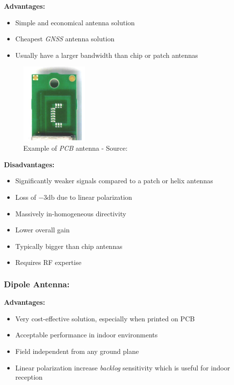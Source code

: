 \documentclass[report.tex]{subfiles}
\begin{document}
\begin{flushleft}
\textbf{Advantages:}
\end{flushleft}
\begin{itemize}
\item Simple and economical antenna solution
\item Cheapest \textit{GNSS} antenna solution
\item Usually have a larger bandwidth than chip or patch antennas
\end{itemize}

\begin{figure}[H]
	\centering
	\includegraphics[width=0.3\textwidth, angle=90]{Include/Figure/antenna/pcb_antenna.png}
	\caption{Example of \textit{PCB} antenna - Source:\cite{gnss_ant_intro}}
	\label{fig:pcb_antenna}
\end{figure}

\begin{flushleft}
\textbf{Disadvantages:}
\end{flushleft}
\begin{itemize}
\item Significantly weaker signals compared to a patch or helix antennas
\item Loss of $-3\si{\decibel}$ due to linear polarization
\item Massively in-homogeneous directivity
\item Lower overall gain
\item Typically bigger than chip antennas
\item Requires RF expertise
\end{itemize}

\subsubsection{Dipole Antenna:}

\begin{flushleft}
\textbf{Advantages:}
\end{flushleft}
\begin{itemize}
\item Very cost-effective solution, especially when printed on PCB
\item Acceptable performance in indoor environments
\item Field independent from any ground plane
\item Linear polarization increase \textit{backlog} sensitivity which is useful for indoor reception
\end{itemize}
\end{document}
